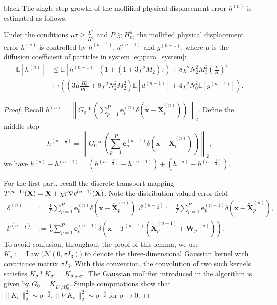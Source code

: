 \documentclass[review,onefignum,onetabnum]{siamart250211}
\begin{document}
\begin{color}{black}
The single-step growth of the mollified physical displacement error $h^{(n)}$ is estimated as follows.
\begin{lemma}
\label{lemma:h_bound}
Under the conditions \(\mu\tau \geq \frac{L^2}{H_0^2}\) and \(P\gtrsim H_0^5\), the mollified physical displacement error $h^{(n)}$ is controlled by $h^{(n-1)}$, $d^{(n-1)}$ and $g^{(n-1)}$, where $\mu$ is the diffusion coefficient of particles in system \eqref{eq:para_system}:
\begin{equation}
\begin{aligned}
\mathbb{E}[h^{(n)}] &\leq \mathbb{E}[h^{(n-1)}](1+(1+3\chi^2M_2) \tau) +8\chi^2 N_2^2 M_3^2 \left(\frac{L}{H}\right)^4\\
&+ \tau \left(\left(3\mu \frac{H_0^5}{PL^5}+8\chi ^2 N_2^2M_2^2\right)\mathbb{E}[d^{(n-1)}]  +4 \chi^2N_0^2\mathbb{E}[g^{(n-1)}]\right).
\end{aligned}
\end{equation}
\end{lemma}
\begin{proof}
Recall $h^{(n)} = \left\|G_0 \ast \left(\sum_{p=1}^P\mathbf{e}_p^{(n)}\delta(\mathbf{x} - \widetilde{\mathbf{X}}_p^{(n)})\right)\right\|_2$. Define the middle step
\begin{equation}
h^{(n-\frac{1}{2})} = \left\|G_0 \ast \left(\sum_{p=1}^P\mathbf{e}_p^{(n-1)}\delta(\mathbf{x} - \widetilde{\mathbf{X}}_p^{(n)})\right)\right\|_2,
\end{equation}
we have $h^{(n)} - h^{(n-1)} = (h^{(n-\frac{1}{2})}-h^{(n-1)})+(h^{(n)}-h^{(n-\frac{1}{2})})$.


For the first part, recall the discrete transport mapping \(T^{(n-1)}(\mathbf{X})
=\\
\mathbf{X}+\chi\tau\nabla c^{(n-1)}(\mathbf{X})\). Note the distribution-valued error field
\begin{equation}
\begin{aligned}
\mathcal{E}^{(n)}&:=\frac{1}{P}\sum_{p=1}^P\mathbf{e}_p^{(n)}\delta(\mathbf{x} - \widetilde{\mathbf{X}}_p^{(n)}),\mathcal{E}^{(n-\frac{1}{2})}:=\frac{1}{P}\sum_{p=1}^P\mathbf{e}_p^{(n-1)}\delta(\mathbf{x} - \widetilde{\mathbf{X}}_p^{(n)}),\\
\mathcal{E}^{(n-\frac{3}{4})}&:=\frac{1}{P}\sum_{p=1}^P\mathbf{e}_p^{(n-1)}\delta\left(\mathbf{x} - T^{(n-1)}(\widetilde{\mathbf{X}}_p^{(n-1)}+\mathbf{W}_p^{-(n)})\right).
\end{aligned}
\end{equation}
To avoid confusion, throughout the proof of this lemma, we use
\(K_\sigma := \operatorname{Law}\bigl(\mathcal{N}(0,\sigma I_3)\bigr)\)
to denote the three-dimensional Gaussian kernel with covariance matrix
$\sigma I_3$. With this convention, the convolution of two such kernels
satisfies
\(K_\sigma * K_{\sigma'} = K_{\sigma+\sigma'}.\)
The Gaussian mollifier introduced in the algorithm is given by
\(G_0 = K_{{L^2}/{H_0^2}}\). Simple computations show that \(\|K_\sigma\|_2^2 \sim \sigma^{-\frac{3}{2}},\|\nabla K_\sigma\|_2^2 \sim \sigma^{-\frac{5}{2}}\) for \(\sigma \to 0\).


\end{proof}
\end{color}
\end{document}
